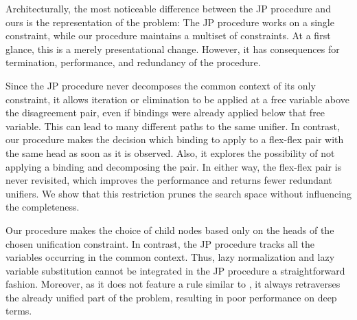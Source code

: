 Architecturally, the most noticeable difference between the JP procedure and ours is
the representation of the problem: The JP procedure works on a single constraint,
while our procedure maintains a multiset of constraints. At a first glance, this
is a merely presentational change. However, it has consequences for termination,
performance, and redundancy of the procedure.

Since the JP procedure never decomposes the common context of its only constraint, it allows
iteration or elimination to be applied at a free variable above the disagreement
pair, even if  bindings were already applied below that free variable. This can
lead to many different paths to the same unifier. In contrast, our procedure
makes the decision which binding to apply to a flex-flex pair with the same
head as soon as it is observed. Also, it explores the possibility of not
applying a binding and decomposing the pair. In either way, the flex-flex pair
is never revisited, which improves the performance and returns fewer redundant
unifiers. We show that this restriction prunes the search space without
influencing the completeness.

Our procedure makes the choice of child nodes based only on the heads of the
chosen unification constraint. In contrast, the JP procedure tracks all the
variables occurring in the common context. Thus, lazy normalization and lazy
variable substitution cannot be integrated in the JP procedure a straightforward
fashion. Moreover, as it does not feature a rule similar to
, it always retraverses the already unified part of the
problem, resulting in poor performance on deep terms.


